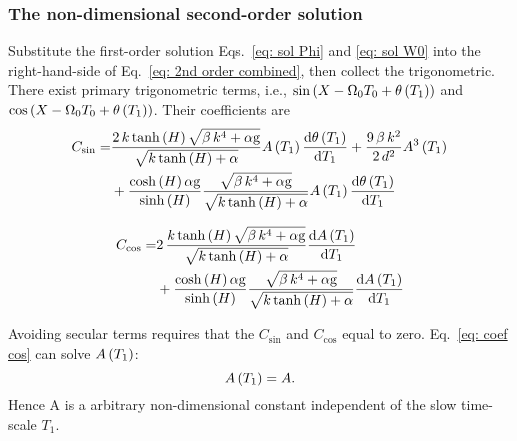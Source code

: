 \subsubsection{The non-dimensional second-order solution}
Substitute the first-order solution Eqs.~\eqref{eq: sol Phi} and \eqref{eq: sol W0} into the right-hand-side of Eq.~\eqref{eq: 2nd order combined}, then collect the trigonometric. There exist primary trigonometric terms, i.e., \ensuremath{\sin\bkt{ X - \Omega_0 T_0 + \theta\bkt{T_1}}} and \ensuremath{\cos\bkt{ X - \Omega_0 T_0 + \theta\bkt{T_1}}}. Their coefficients are
\begin{equation}
    \begin{aligned}
        C_{\sin}
        = & 
        {\frac {2\,k\tanh \left( H \right) \sqrt {\beta\,{k}^{4}+\alpha\mathrm{g}} }{\sqrt {k\tanh \left( H \right) +\alpha}}}  A \left( T_{1} \right)  {\frac {{\rm d} \theta \left( T_{1} \right)}{{\rm d}T_{1}}}
        + {\frac {9\,\beta\,{k}^{2} }{2\,{d}^{2}}}  A^{3}  \left( T_{1} \right)  \\
        & + \frac {\cosh \left( H \right) \alpha\mathrm{g} }{\sinh \left( H \right) }   {\frac {\sqrt {\beta\,{k}^{4}+\alpha\mathrm{g}}}{\sqrt {k\tanh \left( H \right) +\alpha}}}  A \left( T_{1} \right) {\frac {{\rm d} \theta \left( T_{1} \right)}{{\rm d}T_{1}}}
    \end{aligned}
    \label{eq: coef sin}
\end{equation}

\begin{equation}
    \begin{aligned}
        C_{\cos}
        = & 
        2\,{\frac {k\tanh \left( H \right)   \sqrt {\beta\,{k}^{4}+\alpha\mathrm{g}}}{\sqrt {k\tanh \left( H \right) +\alpha}}}   {\frac {{\rm d} A \left( T_{1} \right)}{{\rm d}T_{1}}}   \\
        & + \frac {\cosh \left( H \right) \alpha\mathrm{g} }{\sinh \left( H \right) } 
        {\frac {\sqrt {\beta\,{k}^{4}+\alpha\mathrm{g}}}{\sqrt {k\tanh \left( H \right) +\alpha}}}  \frac {{\rm d} A \left( T_{1} \right)}{{{\rm d} }T_{1}}
    \end{aligned}
    \label{eq: coef cos}
\end{equation}

Avoiding secular terms requires that the \ensuremath{C_{\sin}} and \ensuremath{C_{\cos}} equal to zero. Eq.~\eqref{eq: coef cos} can solve \ensuremath{A\bkt{T_1}}:
\begin{equation}
    A\left(T_1\right) = A.
    \label{eq: sol C4}
\end{equation}
Hence A is a arbitrary non-dimensional constant independent of the slow time-scale \ensuremath{T_1}.

